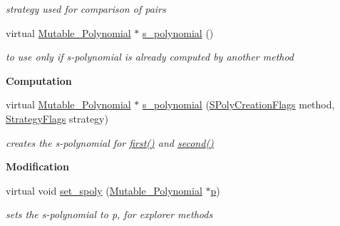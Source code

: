 \begin{Indent}
\begin{DoxyCompactItemize}
\begin{DoxyCompactList}\small\item\em strategy used for comparison of pairs \end{DoxyCompactList}\item 
virtual \hyperlink{group__polygroup_class_mutable___polynomial}{Mutable\+\_\+\+Polynomial} $\ast$ \hyperlink{group___g_b_computation_ab2dbac89b07b2acfad633a9de8f56fab}{s\+\_\+polynomial} ()
\begin{DoxyCompactList}\small\item\em to use only if s-\/polynomial is already computed by another method \end{DoxyCompactList}\end{DoxyCompactItemize}
\end{Indent}
\begin{Indent}\textbf{ Computation}\par
\begin{DoxyCompactItemize}
\item 
\mbox{\label{group___g_b_computation_aedcb486aa7298a6ed5a1980890df0780}} 
virtual \hyperlink{group__polygroup_class_mutable___polynomial}{Mutable\+\_\+\+Polynomial} $\ast$ \hyperlink{group___g_b_computation_aedcb486aa7298a6ed5a1980890df0780}{s\+\_\+polynomial} (\hyperlink{group___g_b_computation_ga73257b8a2d5cc826853a71b77d0cebf2}{S\+Poly\+Creation\+Flags} method, \hyperlink{group__strategygroup_ga0ee6c8e033547330e6b89929730007f4}{Strategy\+Flags} strategy)
\begin{DoxyCompactList}\small\item\em creates the s-\/polynomial for \hyperlink{group___g_b_computation_a6e251e3724fde2c610d921f93889eb67}{first()} and \hyperlink{group___g_b_computation_a06da1cbbe1451962b68f2bbf90855fae}{second()} \end{DoxyCompactList}\end{DoxyCompactItemize}
\end{Indent}
\begin{Indent}\textbf{ Modification}\par
\begin{DoxyCompactItemize}
\item 
\mbox{\label{group___g_b_computation_ad3ba8ead12784e3133eedf75e7601326}} 
virtual void \hyperlink{group___g_b_computation_ad3ba8ead12784e3133eedf75e7601326}{set\+\_\+spoly} (\hyperlink{group__polygroup_class_mutable___polynomial}{Mutable\+\_\+\+Polynomial} $\ast$\hyperlink{group___g_b_computation_ac80ca2c599a7c234e01e5377292d9a5a}{p})
\begin{DoxyCompactList}\small\item\em sets the s-\/polynomial to {\ttfamily p}, for explorer methods \end{DoxyCompactList}\end{DoxyCompactItemize}
\end{Indent}
